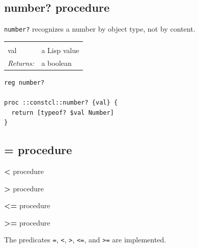 \documentclass[twoside,9pt]{report}
\begin{document}
\subsection{number? procedure}
\label{number?-procedure}


\texttt{number?} recognizes a number by object type, not by content.

\noindent\begin{tabular}{ |p{1.9cm} p{8cm}| }
\hline
\rowcolor[HTML]{CCCCCC} \multicolumn{2}{|l|}{\bf number? (public)} \\
val & a Lisp value \\
\textit{Returns:} & a boolean \\
\hline
\end{tabular}
\begin{lstlisting}
reg number?

proc ::constcl::number? {val} {
  return [typeof? $val Number]
}
\end{lstlisting}
\subsection{= procedure}
\label{=-procedure}

\noindent \textbf{<} procedure


\noindent \textbf{>} procedure


\noindent \textbf{<=} procedure


\noindent \textbf{>=} procedure



The predicates \texttt{=}, \texttt{<}, \texttt{>}, \texttt{<=}, and \texttt{>=} are implemented.
\end{document}
